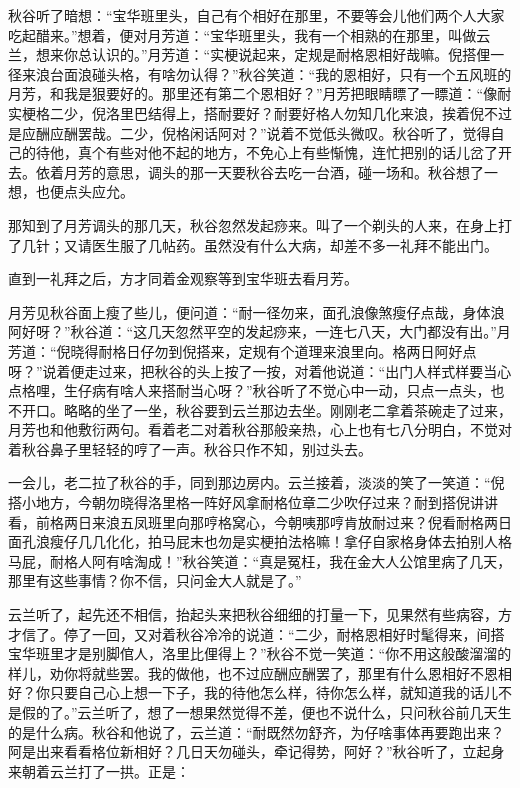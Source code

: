 \documentclass[12pt,UTF8]{ctexbook}
\begin{document}
{{{秋谷听了暗想：“宝华班里头，自己有个相好在那里，不要等会儿他们两个人大家吃起醋来。”想着，便对月芳道：“宝华班里头，我有一个相熟的在那里，叫做云兰，想来你总认识的。”月芳道：“实梗说起来，定规是耐格恩相好哉嘛。倪搭俚一径来浪台面浪碰头格，有啥勿认得？”秋谷笑道：“我的恩相好，只有一个五风班的月芳，和我是狠要好的。那里还有第二个恩相好？”月芳把眼睛瞟了一瞟道：“像耐实梗格二少，倪洛里巴结得上，搭耐要好？耐要好格人勿知几化来浪，挨着倪不过是应酬应酬罢哉。二少，倪格闲话阿对？”说着不觉低头微叹。秋谷听了，觉得自己的待他，真个有些对他不起的地方，不免心上有些惭愧，连忙把别的话儿岔了开去。依着月芳的意思，调头的那一天要秋谷去吃一台酒，碰一场和。秋谷想了一想，也便点头应允。

那知到了月芳调头的那几天，秋谷忽然发起痧来。叫了一个剃头的人来，在身上打了几针；又请医生服了几帖药。虽然没有什么大病，却差不多一礼拜不能出门。

直到一礼拜之后，方才同着金观察等到宝华班去看月芳。

月芳见秋谷面上瘦了些儿，便问道：“耐一径勿来，面孔浪像煞瘦仔点哉，身体浪阿好呀？”秋谷道：“这几天忽然平空的发起痧来，一连七八天，大门都没有出。”月芳道：“倪晓得耐格日仔勿到倪搭来，定规有个道理来浪里向。格两日阿好点呀？”说着便走过来，把秋谷的头上按了一按，对着他说道：“出门人样式样要当心点格哩，生仔病有啥人来搭耐当心呀？”秋谷听了不觉心中一动，只点一点头，也不开口。略略的坐了一坐，秋谷要到云兰那边去坐。刚刚老二拿着茶碗走了过来，月芳也和他敷衍两句。看着老二对着秋谷那般亲热，心上也有七八分明白，不觉对着秋谷鼻子里轻轻的哼了一声。秋谷只作不知，别过头去。

一会儿，老二拉了秋谷的手，同到那边房内。云兰接着，淡淡的笑了一笑道：“倪搭小地方，今朝勿晓得洛里格一阵好风拿耐格位章二少吹仔过来？耐到搭倪讲讲看，前格两日来浪五凤班里向那哼格窝心，今朝咦那哼肯放耐过来？倪看耐格两日面孔浪瘦仔几几化化，拍马屁末也勿是实梗拍法格嘛！拿仔自家格身体去拍别人格马屁，耐格人阿有啥淘成！”秋谷笑道：“真是冤枉，我在金大人公馆里病了几天，那里有这些事情？你不信，只问金大人就是了。”

云兰听了，起先还不相信，抬起头来把秋谷细细的打量一下，见果然有些病容，方才信了。停了一回，又对着秋谷冷冷的说道：“二少，耐格恩相好时髦得来，间搭宝华班里才是别脚倌人，洛里比俚得上？”秋谷不觉一笑道：“你不用这般酸溜溜的样儿，劝你将就些罢。我的做他，也不过应酬应酬罢了，那里有什么恩相好不恩相好？你只要自己心上想一下子，我的待他怎么样，待你怎么样，就知道我的话儿不是假的了。”云兰听了，想了一想果然觉得不差，便也不说什么，只问秋谷前几天生的是什么病。秋谷和他说了，云兰道：“耐既然勿舒齐，为仔啥事体再要跑出来？阿是出来看看格位新相好？几日天勿碰头，牵记得势，阿好？”秋谷听了，立起身来朝着云兰打了一拱。正是：

}}}
\end{document}
